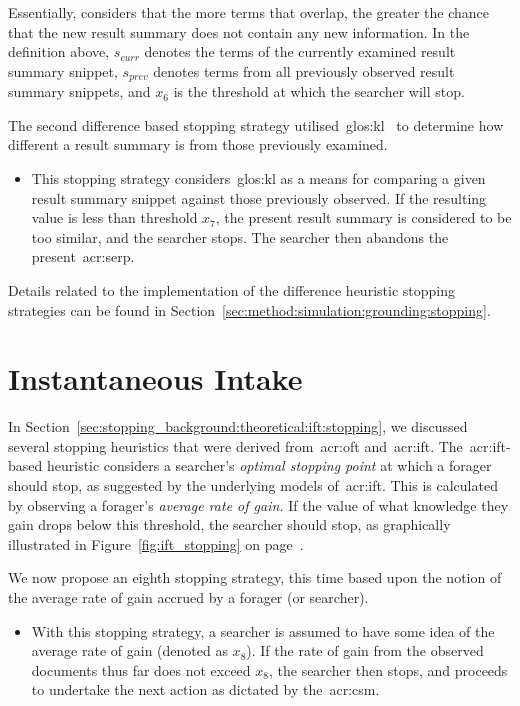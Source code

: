 Essentially,  considers that the more terms that overlap, the greater the chance that the new result summary does not contain any new information. In the definition above, $s_{curr}$ denotes the terms of the currently examined result summary snippet, $s_{prev}$ denotes terms from all previously observed result summary snippets, and $x_6$ is the threshold at which the searcher will stop.

The second difference based stopping strategy utilised~\gls{glos:kl}~\citep{kullback1951information} to determine how different a result summary is from those previously examined.

\begin{itemize}
    \item{ This stopping strategy considers~\gls{glos:kl} as a means for comparing a given result summary snippet against those previously observed. If the resulting value is less than threshold $x_7$, the present result summary is considered to be too similar, and the searcher stops. The searcher then abandons the present~\gls{acr:serp}.}
\end{itemize}

Details related to the implementation of the difference heuristic stopping strategies can be found in Section~\ref{sec:method:simulation:grounding:stopping}.

\section{Instantaneous Intake}
In Section~\ref{sec:stopping_background:theoretical:ift:stopping}, we discussed several stopping heuristics that were derived from~\gls{acr:oft} and~\gls{acr:ift}. The~\gls{acr:ift}-based heuristic considers a searcher's \emph{optimal stopping point} at which a forager should stop, as suggested by the underlying models of~\gls{acr:ift}. This is calculated by observing a forager's \emph{average rate of gain.} If the value of what knowledge they gain drops below this threshold, the searcher should stop, as graphically illustrated in Figure~\ref{fig:ift_stopping} on page~\pageref{fig:ift_stopping}.

We now propose an eighth stopping strategy, this time based upon the notion of the average rate of gain accrued by a forager (or searcher).

\begin{itemize}
    \item{ With this stopping strategy, a searcher is assumed to have some idea of the average rate of gain (denoted as $x_8$). If the rate of gain from the observed documents thus far does not exceed $x_8$, the searcher then stops, and proceeds to undertake the next action as dictated by the~\gls{acr:csm}.}
\end{itemize}


